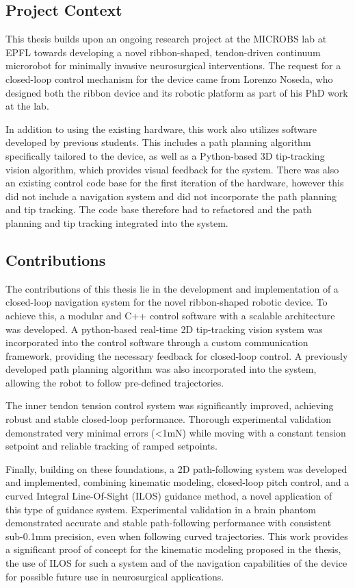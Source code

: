 \subsection{Project Context}
This thesis builds upon an ongoing research project at the MICROBS lab at EPFL towards developing a novel ribbon-shaped, tendon-driven continuum microrobot for minimally invasive neurosurgical interventions. The request for a closed-loop control mechanism for the device came from Lorenzo Noseda, who designed both the ribbon device and its robotic platform as part of his PhD work at the lab. 

In addition to using the existing hardware, this work also utilizes software developed by previous students. This includes a path planning algorithm specifically tailored to the device, as well as a Python-based 3D tip-tracking vision algorithm, which provides visual feedback for the system. There was also an existing control code base for the first iteration of the hardware, however this did not include a navigation system and did not incorporate the path planning and tip tracking. The code base therefore had to refactored and the path planning and tip tracking integrated into the system.


\subsection{Contributions}
The contributions of this thesis lie in the development and implementation of a closed-loop navigation system for the novel ribbon-shaped robotic device. To achieve this, a modular and C++ control software with a scalable architecture was developed. A python-based real-time 2D tip-tracking vision system was incorporated into the control software through a custom communication framework, providing the necessary feedback for closed-loop control. A previously developed path planning algorithm was also incorporated into the system, allowing the robot to follow pre-defined trajectories.

The inner tendon tension control system was significantly improved, achieving robust and stable closed-loop performance. Thorough experimental validation demonstrated very minimal errors (<1mN) while moving with a constant tension setpoint and reliable tracking of ramped setpoints.

Finally, building on these foundations, a 2D path-following system was developed and implemented, combining kinematic modeling, closed-loop pitch control, and a curved Integral Line-Of-Sight (ILOS) guidance method, a novel application of this type of guidance system. Experimental validation in a brain phantom demonstrated accurate and stable path-following performance with consistent sub-0.1mm precision, even when following curved trajectories. This work provides a significant proof of concept for the kinematic modeling proposed in the thesis, the use of ILOS for such a system and of the navigation capabilities of the device for possible future use in neurosurgical applications.


